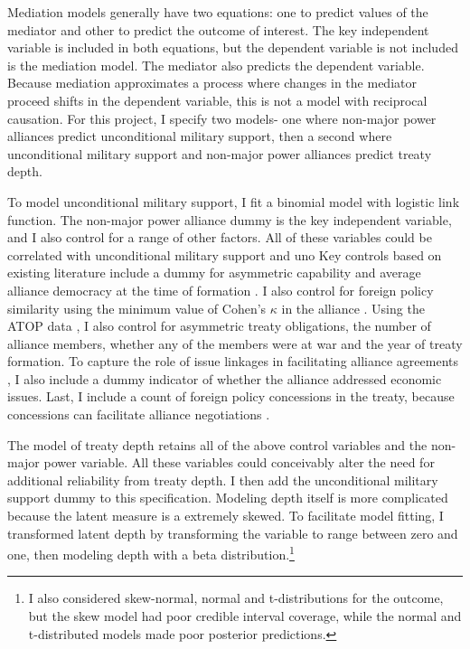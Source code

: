 \documentclass[12pt]{article}
\begin{document}
Mediation models generally have two equations: one to predict values of the mediator and other to predict the outcome of interest. 
The key independent variable is included in both equations, but the dependent variable is not included is the mediation model. 
The mediator also predicts the dependent variable. 
Because mediation approximates a process where changes in the mediator proceed shifts in the dependent variable, this is not a model with reciprocal causation. 
For this project, I specify two models- one where non-major power alliances predict unconditional military support, then a second where unconditional military support and non-major power alliances predict treaty depth. 


To model unconditional military support, I fit a binomial model with logistic link function. 
The non-major power alliance dummy is the key independent variable, and I also control for a range of other factors.
All of these variables could be correlated with unconditional military support and uno
Key controls based on existing literature include a dummy for asymmetric capability \citep{Mattes2012} and average alliance democracy at the time of formation \citep{Chibaetal2015}. 
I also control for foreign policy similarity \citep{Benson2012} using the minimum value of Cohen's $\kappa$ in the alliance \citep{Hage2011}.
Using the ATOP data \citep{Leedsetal2002}, I also control for asymmetric treaty obligations, the number of alliance members, whether any of the members were at war and the year of treaty formation. 
To capture the role of issue linkages in facilitating alliance agreements \citep{Poast2012, Poast2013}, I also include a dummy indicator of whether the alliance addressed economic issues.  
Last, I include a count of foreign policy concessions in the treaty, because concessions can facilitate alliance negotiations \citep{Johnson2015}. 


The model of treaty depth retains all of the above control variables and the non-major power variable. 
All these variables could conceivably alter the need for additional reliability from treaty depth. 
I then add the unconditional military support dummy to this specification. 
Modeling depth itself is more complicated because the latent measure is a extremely skewed.
To facilitate model fitting, I transformed latent depth by transforming the variable to range between zero and one, then modeling depth with a beta distribution.\footnote{I also considered skew-normal, normal and t-distributions for the outcome, but the skew model had poor credible interval coverage, while the normal and t-distributed models made poor posterior predictions.}
\end{document}
